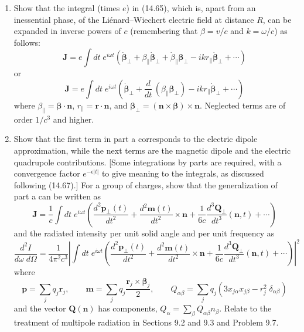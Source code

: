 \begin{enumerate}
\item[(a)] Show that the integral (times $e$) in (14.65), which is, apart from an inessential phase,  of the Li\'enard--Wiechert electric field at distance $R$, can be expanded in inverse powers of $c$ (remembering that $\beta=v/c$ and $k=\omega/c$) as follows:
\[
\mathbf{J}=e\int dt\;e^{i\omega t}(\dot{\boldsymbol{\beta}}_{\perp}+\beta_{\parallel}\dot{\boldsymbol{\beta}}_{\perp}+\dot{\beta}_{\parallel}\boldsymbol{\beta}_{\perp}-ikr_{\parallel}\dot{\boldsymbol{\beta}}_{\perp}+\cdots)
\]
or
\[
\mathbf{J}=e\int dt\;e^{i\omega t}\!\left(\dot{\boldsymbol{\beta}}_{\perp}+\frac{d}{dt}\,(\beta_{\parallel}\boldsymbol{\beta}_{\perp})-ikr_{\parallel}\dot{\boldsymbol{\beta}}_{\perp}+\cdots\right)
\]
where $\beta_{\parallel}=\boldsymbol{\beta}\cdot\mathbf{n}$, $r_{\parallel}=\mathbf{r}\cdot\mathbf{n}$, and $\boldsymbol{\beta}_{\perp}=(\mathbf{n}\times\boldsymbol{\beta})\times\mathbf{n}$. Neglected terms are of order $1/c^{3}$ and higher.
\item[(b)] Show that the first term in part a corresponds to the electric dipole approximation, while the next terms are the magnetic dipole and the electric quadrupole contributions. [Some integrations by parts are required, with a convergence factor $e^{-\epsilon|t|}$ to give meaning to the integrals, as discussed following (14.67).] For a group of charges, show that the generalization of part a can be written as
\[
\mathbf{J}=\frac{1}{c}\int dt\;e^{i\omega t}\!\left(\frac{d^{2}\mathbf{p}_{\perp}(t)}{dt^{2}}+\frac{d^{2}\mathbf{m}(t)}{dt^{2}}\times\mathbf{n}+\frac{1}{6c}\frac{d^{3}\mathbf{Q}_{\perp}}{dt^{3}}(\mathbf{n},t)+\cdots\right)
\]
and the radiated intensity per unit solid angle and per unit frequency as
\[
\frac{d^{2}I}{d\omega\;d\Omega}=\frac{1}{4\pi^{2}c^{3}}\left|\int dt\;e^{i\omega t}\!\left(\frac{d^{2}\mathbf{p}_{\perp}(t)}{dt^{2}}+\frac{d^{2}\mathbf{m}(t)}{dt^{2}}\times\mathbf{n}+\frac{1}{6c}\frac{d^{3}\mathbf{Q}_{\perp}}{dt^{3}}(\mathbf{n},t)+\cdots\right)\right|^{2}
\]
where
\[
\mathbf{p}=\sum_{j}q_{j}\mathbf{r}_{j},\qquad
\mathbf{m}=\sum_{j}q_{j}\frac{\mathbf{r}_{j}\times\boldsymbol{\beta}_{j}}{2},\qquad
Q_{\alpha\beta}=\sum_{j}q_{j}(3x_{j\alpha}x_{j\beta}-r_{j}^{2}\;\delta_{\alpha\beta})
\]
and the vector $\mathbf{Q}(\mathbf{n})$ has components, $Q_{\alpha}=\sum_{\beta}Q_{\alpha\beta}n_{\beta}$. Relate to the treatment of multipole radiation in Sections 9.2 and 9.3 and Problem 9.7.
\end{enumerate}
\solution

